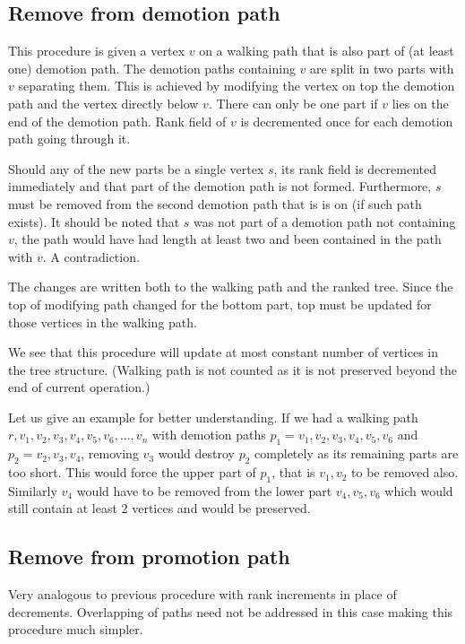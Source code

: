\subsection{Remove from demotion path}

This procedure is given a vertex $v$ on a walking path that is also part of (at least one) demotion path. The demotion paths containing $v$ are split in two parts with $v$ separating them. This is achieved by modifying the vertex on top the demotion path and the vertex directly below $v$. There can only be one part if $v$ lies on the end of the demotion path. Rank field of $v$ is decremented once for each demotion path going through it. 

Should any of the new parts be a single vertex $s$, its rank field is decremented immediately and that part of the demotion path is not formed. Furthermore, $s$ must be removed from the second demotion path that is is on (if such path exists). It should be noted that $s$ was not part of a demotion path not containing $v$, the path would have had length at least two and been contained in the path with $v$. A contradiction. 

The changes are written both to the walking path and the ranked tree. Since the top of modifying path changed for the bottom part, top must be updated for those vertices in the walking path.

We see that this procedure will update at most constant number of vertices in the tree structure. (Walking path is not counted as it is not preserved beyond the end of current operation.)

Let us give an example for better understanding. If we had a walking path $r,v_1,v_2,v_3,v_4,v_5,v_6,...,v_n$ with demotion paths $p_1 = v_1,v_2,v_3,v_4,v_5,v_6$ and $p_2 = v_2,v_3,v_4$, removing $v_3$ would destroy $p_2$ completely as its remaining parts are too short. This would force the upper part of $p_1$, that is $v_1,v_2$ to be removed also. Similarly $v_4$ would have to be removed from the lower part $v_4,v_5,v_6$ which would still contain at least 2 vertices and would be preserved.


\subsection{Remove from promotion path}

Very analogous to previous procedure with rank increments in place of decrements. Overlapping of paths need not be addressed in this case making this procedure much simpler.

